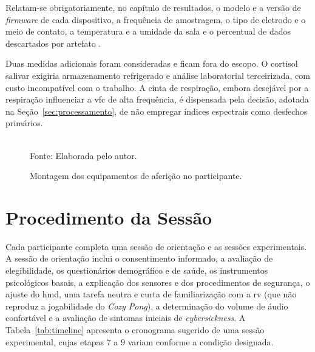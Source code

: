 Relatam-se obrigatoriamente, no capítulo de resultados, o modelo e a versão de \textit{firmware} de cada dispositivo, a frequência de amostragem, o tipo de eletrodo e o meio de contato, a temperatura e a umidade da sala e o percentual de dados descartados por artefato \citep{Boucsein2012,Laborde2017}.

Duas medidas adicionais foram consideradas e ficam fora do escopo. O cortisol salivar exigiria armazenamento refrigerado e análise laboratorial terceirizada, com custo incompatível com o trabalho. A cinta de respiração, embora desejável por a respiração influenciar a \gls{vfc} de alta frequência, é dispensada pela decisão, adotada na Seção~\ref{sec:processamento}, de não empregar índices espectrais como desfechos primários.

\begin{figure}[H]
    \centering
    \caption{Montagem dos equipamentos de aferição no participante. }
    \label{fig:setup}
    \\[2pt]
    {\footnotesize Fonte: Elaborada pelo autor.}
\end{figure}

\section{Procedimento da Sessão}\label{sec:procedimento}

Cada participante completa uma sessão de orientação e as sessões experimentais. A sessão de orientação inclui o consentimento informado, a avaliação de elegibilidade, os questionários demográfico e de saúde, os instrumentos psicológicos basais, a explicação dos sensores e dos procedimentos de segurança, o ajuste do \gls{hmd}, uma tarefa neutra e curta de familiarização com a \gls{rv} (que não reproduz a jogabilidade do \textit{Cozy Pong}), a determinação do volume de áudio confortável e a avaliação de sintomas iniciais de \textit{cybersickness}. A Tabela~\ref{tab:timeline} apresenta o cronograma sugerido de uma sessão experimental, cujas etapas $7$ a $9$ variam conforme a condição designada.

